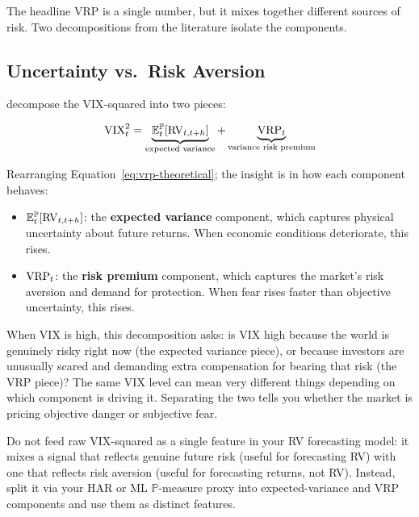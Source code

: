 The headline VRP is a single number, but it mixes together different sources of risk.
Two decompositions from the literature isolate the components.

\subsection{Uncertainty vs.\ Risk Aversion}

\citet{BekaertHoerova2014} decompose the VIX-squared into two pieces:

\begin{equation}
  \text{VIX}^2_t = \underbrace{\mathbb{E}^{\mathbb{P}}_t[\operatorname{RV}_{t,t+h}]}_{\text{expected variance}} + \underbrace{\operatorname{VRP}_t}_{\text{variance risk premium}}
  \label{eq:bh-decomposition}
\end{equation}

Rearranging Equation~\eqref{eq:vrp-theoretical}; the insight is in how each component behaves:

\begin{itemize}[nosep]
  \item $\mathbb{E}^{\mathbb{P}}_t[\operatorname{RV}_{t,t+h}]$: the \textbf{expected variance} component, which captures physical uncertainty about future returns. When economic conditions deteriorate, this rises.
  \item $\operatorname{VRP}_t$: the \textbf{risk premium} component, which captures the market's risk aversion and demand for protection. When fear rises faster than objective uncertainty, this rises.
\end{itemize}

\begin{intuition}
When VIX is high, this decomposition asks: is VIX high because the world is genuinely risky right now (the expected variance piece), or because investors are unusually scared and demanding extra compensation for bearing that risk (the VRP piece)? The same VIX level can mean very different things depending on which component is driving it. Separating the two tells you whether the market is pricing objective danger or subjective fear.
\end{intuition}

\begin{projectconnection}
Do not feed raw VIX-squared as a single feature in your RV forecasting model: it mixes a signal that reflects genuine future risk (useful for forecasting RV) with one that reflects risk aversion (useful for forecasting returns, not RV). Instead, split it via your HAR or ML $\mathbb{P}$-measure proxy into expected-variance and VRP components and use them as distinct features.
\end{projectconnection}

